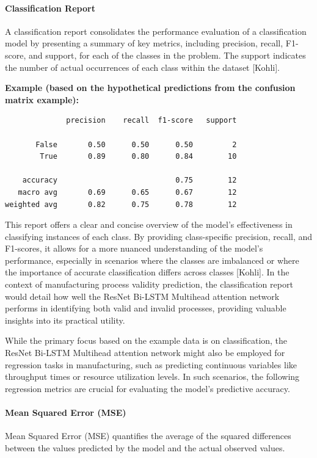 \paragraph{\textbf{Classification Report}}
A classification report consolidates the performance evaluation of a classification model by presenting a summary of key metrics, including precision, recall, F1-score, and support, for each of the classes in the problem. The support indicates the number of actual occurrences of each class within the dataset [Kohli].

\textbf{Example (based on the hypothetical predictions from the confusion matrix example):}
\begin{verbatim}
              precision    recall  f1-score   support

       False       0.50      0.50      0.50         2
        True       0.89      0.80      0.84        10

    accuracy                           0.75        12
   macro avg       0.69      0.65      0.67        12
weighted avg       0.82      0.75      0.78        12
\end{verbatim}

This report offers a clear and concise overview of the model's effectiveness in classifying instances of each class. By providing class-specific precision, recall, and F1-scores, it allows for a more nuanced understanding of the model's performance, especially in scenarios where the classes are imbalanced or where the importance of accurate classification differs across classes [Kohli]. In the context of manufacturing process validity prediction, the classification report would detail how well the ResNet Bi-LSTM Multihead attention network performs in identifying both valid and invalid processes, providing valuable insights into its practical utility.

While the primary focus based on the example data is on classification, the ResNet Bi-LSTM Multihead attention network might also be employed for regression tasks in manufacturing, such as predicting continuous variables like throughput times or resource utilization levels. In such scenarios, the following regression metrics are crucial for evaluating the model's predictive accuracy.

\paragraph{\textbf{Mean Squared Error (MSE)}}
Mean Squared Error (MSE) quantifies the average of the squared differences between the values predicted by the model and the actual observed values.

